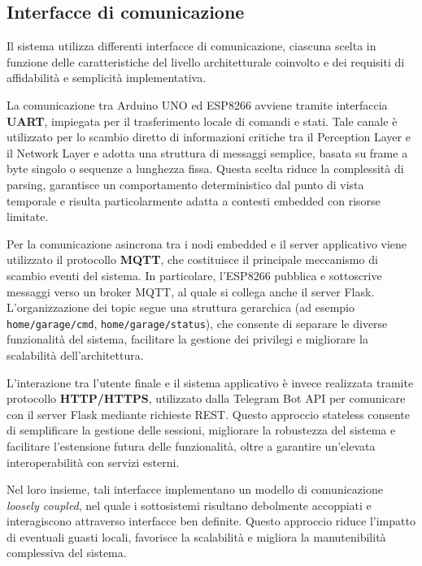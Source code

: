 \subsection*{Interfacce di comunicazione}

Il sistema utilizza differenti interfacce di comunicazione, ciascuna scelta in
funzione delle caratteristiche del livello architetturale coinvolto e dei
requisiti di affidabilità e semplicità implementativa.

La comunicazione tra Arduino UNO ed ESP8266 avviene tramite interfaccia
\textbf{UART}, impiegata per il trasferimento locale di comandi e stati. Tale
canale è utilizzato per lo scambio diretto di informazioni critiche tra il
Perception Layer e il Network Layer e adotta una struttura di messaggi semplice,
basata su frame a byte singolo o sequenze a lunghezza fissa. Questa scelta
riduce la complessità di parsing, garantisce un comportamento deterministico dal
punto di vista temporale e risulta particolarmente adatta a contesti embedded
con risorse limitate.

Per la comunicazione asincrona tra i nodi embedded e il server applicativo viene
utilizzato il protocollo \textbf{MQTT}, che costituisce il principale meccanismo
di scambio eventi del sistema. In particolare, l’ESP8266 pubblica e sottoscrive
messaggi verso un broker MQTT, al quale si collega anche il server Flask.
L’organizzazione dei topic segue una struttura gerarchica (ad esempio
\texttt{home/garage/cmd}, \texttt{home/garage/status}), che consente di separare
le diverse funzionalità del sistema, facilitare la gestione dei privilegi e
migliorare la scalabilità dell’architettura.

L’interazione tra l’utente finale e il sistema applicativo è invece realizzata
tramite protocollo \textbf{HTTP/HTTPS}, utilizzato dalla Telegram Bot API per
comunicare con il server Flask mediante richieste REST. Questo approccio
stateless consente di semplificare la gestione delle sessioni, migliorare la
robustezza del sistema e facilitare l’estensione futura delle funzionalità,
oltre a garantire un’elevata interoperabilità con servizi esterni.

Nel loro insieme, tali interfacce implementano un modello di comunicazione
\textit{loosely coupled}, nel quale i sottosistemi risultano debolmente
accoppiati e interagiscono attraverso interfacce ben definite. Questo approccio
riduce l’impatto di eventuali guasti locali, favorisce la scalabilità e migliora
la manutenibilità complessiva del sistema.

